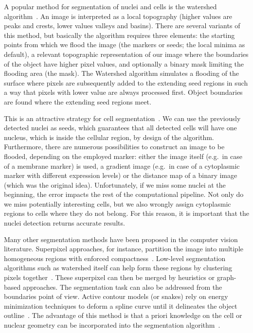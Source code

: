 A popular method for segmentation of nuclei and cells is the watershed algorithm~\cite{Beucher1979, Serra1983, Vincent_1991}.
An image is interpreted as a local topography (higher values are peaks and crests, lower values valleys and basins).
There are several variants of this method, but basically the algorithm requires three elements: the starting points from which we flood the image (the markers or seeds; the local minima as default), a relevant topographic representation of our image where the boundaries of the object have higher pixel values, and optionally a binary mask limiting the flooding area (the mask).
The Watershed algorithm simulates a flooding of the surface where pixels are subsequently added to the extending seed regions in such a way that pixels with lower value are always processed first.
Object boundaries are found where the extending seed regions meet.

This is an attractive strategy for cell segmentation~\cite{Wahlby2002}.
We can use the previously detected nuclei as seeds, which guarantees that all detected cells will have one nucleus, which is inside the cellular region, by design of the algorithm.
Furthermore, there are numerous possibilities to construct an image to be flooded, depending on the employed marker: either the image itself (e.g.~in case of a membrane marker) is used, a gradient image (e.g.~in case of a cytoplasmic marker with different expression levels) or the distance map of a binary image (which was the original idea).
Unfortunately, if we miss some nuclei at the beginning, the error impacts the rest of the computational pipeline.
Not only do we miss potentially interesting cells, but we also wrongly assign cytoplasmic regions to cells where they do not belong.
For this reason, it is important that the nuclei detection returns accurate results.

Many other segmentation methods have been proposed in the computer vision literature.
Superpixel approaches, for instance, partition the image into multiple homogeneous regions with enforced compactness~\cite{Ren_2003}.
Low-level segmentation algorithms such as watershed itself can help form these regions by clustering pixels together~\cite{Machairas_2014}.
These superpixel can then be merged by heuristics or graph-based approaches.
The segmentation task can also be addressed from the boundaries point of view.
Active contour models (or snakes) rely on energy minimization techniques to deform a spline curve until it delineates the object outline~\cite{kass_snakes_1988}.
The advantage of this method is that a priori knowledge on the cell or nuclear geometry can be incorporated into the segmentation algorithm~\cite{Dufour2005}.

